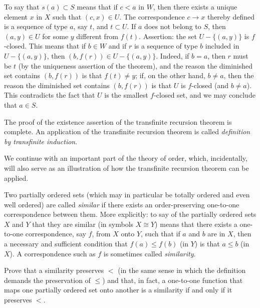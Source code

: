 To say that $s(a) \subset S$ means that if $c < a$ in $W$, then there exists a unique element $x$ in $X$ such that $(c, x) \in U$. The correspondence $c \rightarrow x$ thereby defined is a sequence of type $a$, say $t$, and $t \subset U$. If $a$ does not belong to $S$, then $(a,y) \in U$ for some $y$ different from $f(t)$. Assertion: the set $U - \{ (a, y) \}$ is $f$-closed. This means that if $b \in W$ and if $r$ is a sequence of type $b$ included in $U - \{ (a, y) \}$, then $(b,f(r)) \in U - \{ (a, y) \}$. Indeed, if $b =a$, then $r$ must be $t$ (by the uniqueness assertion of the theorem), and the reason the diminished set contains $(b, f(r))$ is that $f(t) \neq y$; if, on the other hand, $b \neq a$, then the reason the diminished set contains $(b,f(r))$ is that $U$ is $f$-closed (and $b \neq a$). This contradicts the fact that $U$ is the smallest $f$-closed set, and we may conclude that $a \in S$. 

The proof of the existence assertion of the transfinite recursion theorem is complete. An application of the transfinite recursion theorem is called \textit{definition by transfinite induction}. 

We continue with an important part of the theory of order, which, incidentally, will also serve as an illustration of how the transfinite recursion theorem can be applied. 

Two partially ordered sets (which may in particular be totally ordered and even well ordered) are called \textit{similar} if there exists an order-preserving one-to-one correspondence between them. More explicitly: to say of the partially ordered sets $X$ and $Y$ that they are similar (in symbols $X \cong Y$) means that there exists a one-to-one correspondence, say $f$, from $X$ onto $Y$, such that if $a$ and $b$ are in $X$, then a necessary and sufficient condition that $f(a) \le f(b)$ (in $Y$) is that $a \le b$ (in $X$). A correspondence such as $f$ is sometimes called \textit{similarity}. 

\begin{exercise} Prove that a similarity preserves $<$ (in the same sense in which the definition demands the preservation of $\le$) and that, in fact, a one-to-one function that maps one partially ordered set onto another is a similarity if and only if it preserves $<$.
\end{exercise}

